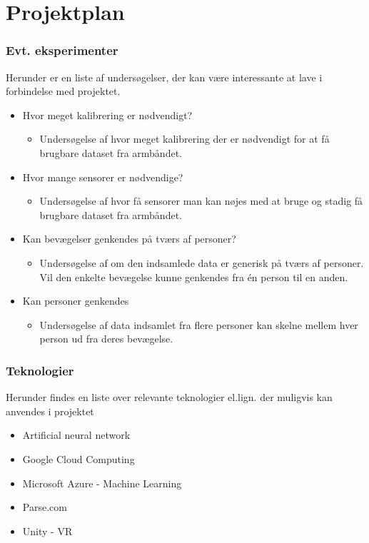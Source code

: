 \thispagestyle{fancy}
\chapter{Projektplan}
\subsection*{Evt. eksperimenter}
Herunder er en liste af undersøgelser, der kan være interessante at lave i forbindelse med projektet.
\begin{itemize}
	\item Hvor meget kalibrering er nødvendigt?
	\begin{itemize}
		\item Undersøgelse af hvor meget kalibrering der er nødvendigt for at få brugbare dataset fra armbåndet.
	\end{itemize}
	\item Hvor mange sensorer er nødvendige?
	\begin{itemize}
		\item Undersøgelse af hvor få sensorer man kan nøjes med at bruge og stadig få brugbare dataset fra armbåndet.
	\end{itemize}
	\item Kan bevægelser genkendes på tværs af personer?
	\begin{itemize}
		\item Undersøgelse af om den indsamlede data er generisk på tværs af personer. Vil den enkelte bevægelse kunne genkendes fra én person til en anden.
	\end{itemize}
	\item Kan personer genkendes
	\begin{itemize}
		\item Undersøgelse af data indsamlet fra flere personer kan skelne mellem hver person ud fra deres bevægelse.
		\end{itemize}
\end{itemize}

\subsection*{Teknologier}
Herunder findes en liste over relevante teknologier el.lign. der muligvis kan anvendes i projektet
\begin{itemize}
	\item Artificial neural network
	\item Google Cloud Computing
	\item Microsoft Azure - Machine Learning
	\item Parse.com
	\item Unity - VR
\end{itemize}

